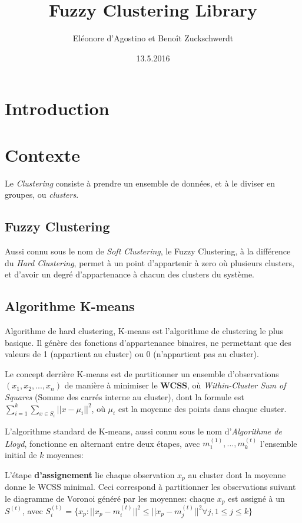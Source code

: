 \documentclass{article}
\title{Fuzzy Clustering Library}
\date{13.5.2016}
\author{Eléonore d'Agostino et Benoît Zuckschwerdt}
\begin{document}
  \maketitle
  \tableofcontents
  \newpage
  
  \section{Introduction}
  
  \section{Contexte}
  
    Le \textit{Clustering} consiste à prendre un ensemble de données, et à le diviser en groupes, ou \textit{clusters}.
  
    \subsection{Fuzzy Clustering}
    
      Aussi connu sous le nom de \textit{Soft Clustering}, le Fuzzy Clustering, à la différence du \textit{Hard Clustering}, permet à un point d'appartenir à zero où plusieurs clusters, et d'avoir un degré d'appartenance à chacun des clusters du système.
    
    \subsection{Algorithme K-means}
    
      Algorithme de hard clustering, K-means est l'algorithme de clustering le plus basique. Il génère des fonctions d'appartenance binaires, ne permettant que des valeurs de 1 (appartient au cluster) ou 0 (n'appartient pas au cluster).
      
      Le concept derrière K-means est de partitionner un ensemble d'observations $(x_1,x_2,...,x_n)$ de manière à minimiser le \textbf{WCSS}, où \textit{Within-Cluster Sum of Squares} (Somme des carrés interne au cluster), dont la formule est $\sum_{i=1}^{k}\sum_{x\in S_i}||x-\mu_i||^2$, où $\mu_i$ est la moyenne des points dans chaque cluster.
      
      L'algorithme standard de K-means, aussi connu sous le nom d'\textit{Algorithme de Lloyd}, fonctionne en alternant entre deux étapes, avec $m_1^{(1)},...,m_k^{(t)}$ l'ensemble initial de $k$ moyennes:
      
      L'étape \textbf{d'assignement} lie chaque observation $x_p$ au cluster dont la moyenne donne le WCSS minimal. Ceci correspond à partitionner les observations suivant le diagramme de Voronoi généré par les moyennes: chaque $x_p$ est assigné à un $S^{(t)}$, avec $S_i^{(t)}=\{x_p:||x_p-m_i^{(t)}||^2\leq ||x_p-m_j^{(t)}||^2\forall j,1\leq j\leq k\}$
      
\end{document}
